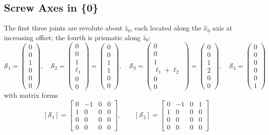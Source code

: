 \documentclass[11pt]{article}
\begin{document}
\subsection*{Screw Axes in \{0\}}
The first three joints are revolute about $\hat z_0$, each located along the $\hat x_0$ axis at increasing offset; the fourth is prismatic along $\hat z_0$:
\[
\mathcal S_1=\begin{pmatrix}0\\0\\1\\0\\0\\0\end{pmatrix},\quad
\mathcal S_2=\begin{pmatrix}0\\0\\1\\\ell_1\\0\\0\end{pmatrix}=\begin{pmatrix}0\\0\\1\\1\\0\\0\end{pmatrix},\quad
\mathcal S_3=\begin{pmatrix}0\\0\\1\\\ell_1+\ell_2\\0\\0\end{pmatrix}=\begin{pmatrix}0\\0\\1\\2\\0\\0\end{pmatrix},\quad
\mathcal S_4=\begin{pmatrix}0\\0\\0\\0\\0\\1\end{pmatrix}
\]
with matrix forms
\[
[\mathcal S_1]=\begin{bmatrix}0&-1&0&0\\1&0&0&0\\0&0&0&0\\0&0&0&0\end{bmatrix}, \qquad
[\mathcal S_2]=\begin{bmatrix}0&-1&0&1\\1&0&0&0\\0&0&0&0\\0&0&0&0\end{bmatrix}
\]
\end{document}
